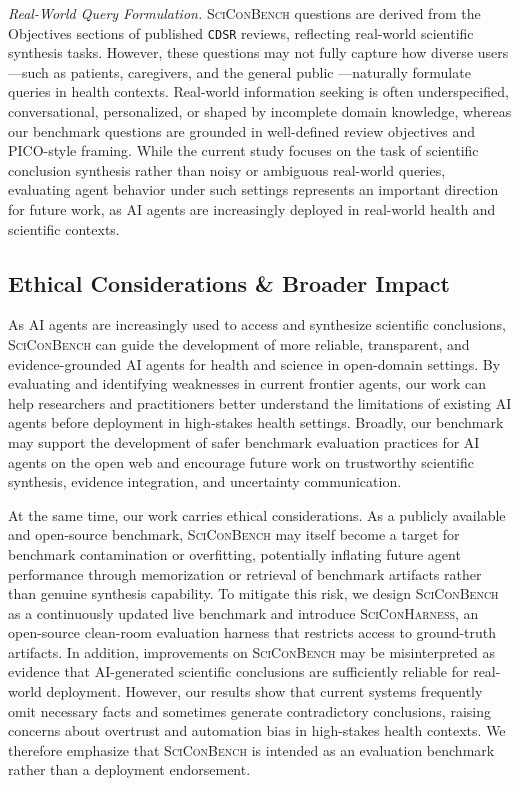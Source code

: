\documentclass{article}
\begin{document}
\textit{Real-World Query Formulation.} \textsc{SciConBench} questions are derived from the Objectives sections of published \texttt{CDSR} reviews, reflecting real-world scientific synthesis tasks. However, these questions may not fully capture how diverse users---such as patients, caregivers, and the general public \cite{kaur2025whosaskingsimulatingrolebased}---naturally formulate queries in health contexts. Real-world information seeking is often underspecified, conversational, personalized, or shaped by incomplete domain knowledge, whereas our benchmark questions are grounded in well-defined review objectives and PICO-style framing. While the current study focuses on the task of scientific conclusion synthesis rather than noisy or ambiguous real-world queries, evaluating agent behavior under such settings represents an important direction for future work, as AI agents are increasingly deployed in real-world health and scientific contexts.


\subsection{Ethical Considerations \& Broader Impact}\label{appendix:ethics}

As AI agents are increasingly used to access and synthesize scientific conclusions, \textsc{SciConBench} can guide the development of more reliable, transparent, and evidence-grounded AI agents for health and science in open-domain settings. By evaluating and identifying weaknesses in current frontier agents, our work can help researchers and practitioners better understand the limitations of existing AI agents before deployment in high-stakes health settings. Broadly, our benchmark may support the development of safer benchmark evaluation practices for AI agents on the open web and encourage future work on trustworthy scientific synthesis, evidence integration, and uncertainty communication.

At the same time, our work carries ethical considerations. As a publicly available and open-source benchmark, \textsc{SciConBench} may itself become a target for benchmark contamination or overfitting, potentially inflating future agent performance through memorization or retrieval of benchmark artifacts rather than genuine synthesis capability. To mitigate this risk, we design \textsc{SciConBench} as a continuously updated live benchmark and introduce \textsc{SciConHarness}, an open-source clean-room evaluation harness that restricts access to ground-truth artifacts. In addition, improvements on \textsc{SciConBench} may be misinterpreted as evidence that AI-generated scientific conclusions are sufficiently reliable for real-world deployment. However, our results show that current systems frequently omit necessary facts and sometimes generate contradictory conclusions, raising concerns about overtrust and automation bias in high-stakes health contexts. We therefore emphasize that \textsc{SciConBench} is intended as an evaluation benchmark rather than a deployment endorsement.
\end{document}
